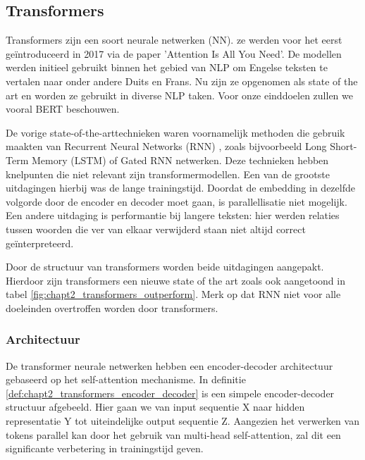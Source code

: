 \subsection{Transformers}
\label{sec:chapt2_transformers}
Transformers zijn een soort neurale netwerken (NN). ze werden voor het eerst geïntroduceerd in 2017 via de paper 'Attention Is All You Need'. \cite{attention_is_all_you_need}
De modellen werden initieel gebruikt binnen het gebied van NLP om Engelse teksten te vertalen naar onder andere Duits en Frans. Nu zijn ze opgenomen als state of the art en worden ze gebruikt in diverse NLP taken. Voor onze einddoelen zullen we vooral BERT beschouwen.


De vorige state-of-the-arttechnieken waren voornamelijk methoden die gebruik maakten van Recurrent Neural Networks (RNN) \cite{rnn_for_nlp}, zoals bijvoorbeeld Long Short-Term Memory (LSTM) \cite{lstm_paper} of Gated RNN \cite{gated_rnn_paper} netwerken. Deze technieken hebben knelpunten die niet relevant zijn transformermodellen. \cite{transformers_knoldus,transformers_datacamp} Een van de grootste uitdagingen hierbij was de lange trainingstijd. Doordat de embedding in dezelfde volgorde door de encoder en decoder moet gaan, is parallellisatie niet mogelijk. Een andere uitdaging is performantie bij langere teksten: hier werden relaties tussen woorden die ver van elkaar verwijderd staan niet altijd correct geïnterpreteerd.

Door de structuur van transformers worden beide uitdagingen aangepakt. Hierdoor zijn transformers een nieuwe state of the art zoals ook aangetoond in tabel \ref{fig:chapt2_transformers_outperform}. Merk op dat RNN niet voor alle doeleinden overtroffen worden door transformers. 

\subsubsection{Architectuur}
De transformer neurale netwerken hebben een encoder-decoder architectuur gebaseerd op het self-attention mechanisme. In definitie \ref{def:chapt2_transformers_encoder_decoder} is een simpele encoder-decoder structuur afgebeeld. Hier gaan we van input sequentie X naar hidden representatie Y tot uiteindelijke output sequentie Z. Aangezien het verwerken van tokens parallel kan door het gebruik van multi-head self-attention, zal dit een significante verbetering in trainingstijd geven.

